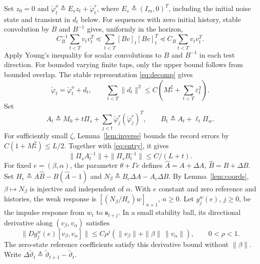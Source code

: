 \documentclass[11pt,reqno]{amsart}
\numberwithin{equation}{section}
\theoremstyle{definition}
\theoremstyle{remark}
\newcommand{\phc}{\check{\varphi}}
\newcommand{\etac}{\widetilde{\vartheta}}
\begin{document}
Set $z_0=0$ and $\phc_t^o\triangleq E_sz_t+\phc_t^r$, where $E_s\triangleq(I_m,0)^T$, including the initial noise state and transient in $d_t$ below.
For sequences with zero initial history, stable convolution by $B$ and $B^{-1}$ gives, uniformly in the horizon,
\begin{equation}\label{eq:filtergram}
 C_B^{-1}\sum_{t<T}v_tv_t^T
 \preceq\sum_{t<T}[Bv]_t[Bv]_t^T
 \preceq C_B\sum_{t<T}v_tv_t^T.
\end{equation}
Apply Young's inequality for scalar convolutions to $B$ and $B^{-1}$ in each test direction. For bounded varying finite taps, only the upper bound follows from bounded overlap.
The stable representation \eqref{eq:decomp} gives
\begin{equation}\label{eq:regerr}
 \phc_t=\phc_t^o+d_t,\qquad
 \sum_{t<T}\|d_t\|^2\le C\left(M_*^2+\sum_{t<T}\varepsilon_t^2\right).
\end{equation}
Set
\begin{equation}\label{eq:localenvelope}
 A_t\triangleq M_0+t\Pi_s+\sum_{j<t}\phc_j^r(\phc_j^r)^T,\qquad
 B_t\triangleq A_t+\ell_t\Pi_w.
\end{equation}
For sufficiently small $\zeta$, Lemma~\ref{lem:inverse} bounds the record errors by $C(1+M_*^2)\le L/2$. Together with \eqref{eq:entry}, it gives
\begin{equation}\label{eq:localinverse}
 \|\Pi_sA_t^{-1}\|+\|\Pi_sB_t^{-1}\|\le C/(L+t).
\end{equation}
For fixed $e=(\beta,\alpha)$, the parameter $\theta+\Gamma e$ defines $\widehat A=A+\Delta A$, $\widehat B=B+\Delta B$. Set $H_e\triangleq A\widehat B-B(\widehat A-1)$ and $N_\beta\triangleq B_c\Delta A-A_c\Delta B$.
By Lemma~\ref{lem:coords}, $\beta\mapsto N_\beta$ is injective and independent of $\alpha$. With $e$ constant and zero reference and histories, the weak response is $[(N_\beta/H_e)w]_{n+1}$, $n\ge0$. Let $g_j^w(e)$, $j\ge0$, be the impulse response from $w_t$ to $\mathbf s_{t+j}$. In a small stability ball, its directional derivative along $(v_\beta,v_\alpha)$ satisfies
\begin{equation}\label{eq:frozenderiv}
 \|Dg_j^w(e)[v_\beta,v_\alpha]\|
 \le C\rho^j(\|v_\beta\|+\|\beta\|\,\|v_\alpha\|),
 \qquad 0<\rho<1.
\end{equation}
The zero-state reference coefficients satisfy this derivative bound without $\|\beta\|$. Write $\Delta\etac_t\triangleq\etac_{t+1}-\etac_t$.
\end{document}
